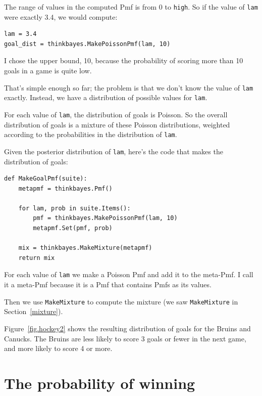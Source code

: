 \documentclass[12pt]{book}
\begin{document}
The range of values in the computed Pmf is from 0 to {\tt high}.
So if the value of {\tt lam} were exactly 3.4, we would compute:

\begin{verbatim}
lam = 3.4
goal_dist = thinkbayes.MakePoissonPmf(lam, 10)
\end{verbatim}

I chose the upper bound, 10, because the probability of scoring
more than 10 goals in a game is quite low.

That's simple enough so far; the problem is that we don't know
the value of {\tt lam} exactly.  Instead, we have a distribution
of possible values for {\tt lam}.

For each value of {\tt lam}, the distribution of goals is Poisson.
So the overall distribution of goals is a mixture of these
Poisson distributions, weighted according to the probabilities
in the distribution of {\tt lam}.

Given the posterior distribution of {\tt lam}, here's the code
that makes the distribution of goals:

\begin{verbatim}
def MakeGoalPmf(suite):
    metapmf = thinkbayes.Pmf()

    for lam, prob in suite.Items():
        pmf = thinkbayes.MakePoissonPmf(lam, 10)
        metapmf.Set(pmf, prob)

    mix = thinkbayes.MakeMixture(metapmf)
    return mix
\end{verbatim}  

For each value of {\tt lam} we make a Poisson Pmf and add it to the
meta-Pmf.  I call it a meta-Pmf because it is a Pmf that contains
Pmfs as its values.

Then we use \verb"MakeMixture" to compute the mixture
(we saw {\tt MakeMixture} in Section~\ref{mixture}).

Figure~\ref{fig.hockey2} shows the resulting distribution of goals for
the Bruins and Canucks.  The Bruins are less likely to
score 3 goals or fewer in the next game, and more likely to score 4 or
more.


\section{The probability of winning}
\end{document}
